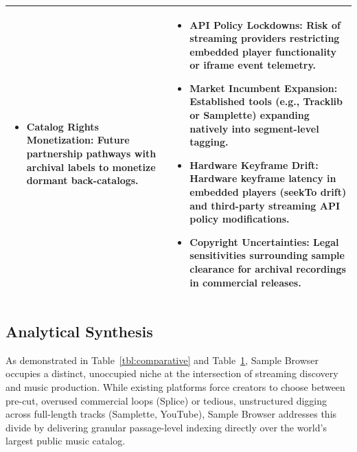\begin{table}[h]
\begin{tabularx}{\textwidth}{|>{\raggedright\arraybackslash}X|>{\raggedright\arraybackslash}X|}
\begin{itemize}[leftmargin=*]
            \item \textbf{Catalog Rights Monetization:} Future partnership pathways with archival labels to monetize dormant back-catalogs.
        \end{itemize} & 
        \begin{itemize}[leftmargin=*]
            \item \textbf{API Policy Lockdowns:} Risk of streaming providers restricting embedded player functionality or iframe event telemetry.
            \item \textbf{Market Incumbent Expansion:} Established tools (e.g., Tracklib or Samplette) expanding natively into segment-level tagging.
            \item \textbf{Hardware Keyframe Drift:} Hardware keyframe latency in embedded players (seekTo drift) and third-party streaming API policy modifications.
            \item \textbf{Copyright Uncertainties:} Legal sensitivities surrounding sample clearance for archival recordings in commercial releases.
        \end{itemize} \\
        \hline
    \end{tabularx}
    \label{tbl:swot}
\end{table}

\subsection*{Analytical Synthesis}
As demonstrated in Table~\ref{tbl:comparative} and Table~\ref{tbl:swot}, Sample Browser occupies a distinct, unoccupied niche at the intersection of streaming discovery and music production. While existing platforms force creators to choose between pre-cut, overused commercial loops (Splice) or tedious, unstructured digging across full-length tracks (Samplette, YouTube), Sample Browser addresses this divide by delivering granular passage-level indexing directly over the world's largest public music catalog.

